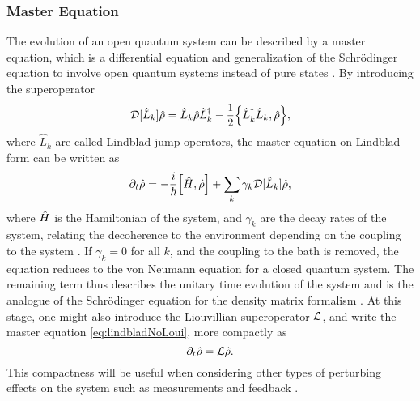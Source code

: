 \subsubsection{Master Equation}\label{sec:mastereq}
The evolution of an open quantum system can be described by a master equation, which is a differential equation and generalization of the Schrödinger equation to involve open quantum systems instead of pure states \cite{Annby-Andersson:2024}. By introducing the superoperator
\begin{equation}
    \super{\hat{L}_k}\dmatrix = \hat{L}_k\dmatrix\hat{L}_k^{\dagger} - \frac{1}{2} \acomm{\hat{L}_k^\dagger \hat{L}_k}{\dmatrix},
\end{equation} 
where $\hat{L}_k$ are called Lindblad jump operators, the master equation on Lindblad form can be written as 
\begin{equation}
    \dt\dmatrix = -\frac{i}{\hbar}\comm{\hamiltonian}{\dmatrix} + \sum_k \gamma_k\super{\hat{L}_k}\dmatrix, \label{eq:lindbladNoLoui}
\end{equation}
where $\hat{H}$ is the Hamiltonian of the system, and $\gamma_k$ are the decay rates of the system, relating the decoherence to the environment depending on the coupling to the system \cite{Annby-Andersson:2024}. If $\gamma_k = 0$ for all $k$, and the coupling to the bath is removed, the equation reduces to the von Neumann equation for a closed quantum system. The remaining term thus describes the unitary time evolution of the system and is the analogue of the Schrödinger equation for the density matrix formalism \cite{Annby-Andersson:2024}. At this stage, one might also introduce the Liouvillian superoperator $\mathcal{L}$, and write the master equation \eqref{eq:lindbladNoLoui}, more compactly as
\begin{equation}
    \partial_t\hat{\rho} = \mathcal{L}\hat{\rho}.
\end{equation}
This compactness will be useful when considering other types of perturbing effects on the system such as measurements and feedback \cite{Annby-Andersson:2024}.

